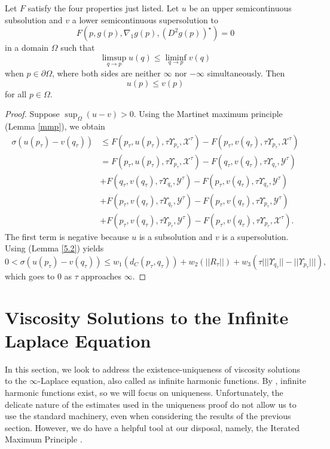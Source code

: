 \documentclass[reqno]{amsart}
\begin{document}
\begin{theorem}
Let $F$ satisfy the four properties just listed. Let $u$ be an upper semicontinuous subsolution and $v$ a lower semicontinuous supersolution to 
\[F(p,g(p),\nabla_1g(p), (D^2g(p))^\star)=0\]
in a domain $\Omega$ such that
\[\limsup_{q\rightarrow p}u(q)\leq\liminf_{q\rightarrow p}v(q)\]
when $p\in\partial\Omega$, where both sides are neither $\infty$ nor $-\infty$ simultaneously. Then
\[u(p)\leq v(p)\]
for all $p\in\Omega$.
\end{theorem}
\begin{proof}
Suppose $\sup_\Omega (u-v)>0.$ Using the Martinet maximum principle (Lemma \ref{mmp}), we obtain
\begin{align*}
\sigma (u(p_\tau)-v(q_\tau))&\leq F(p_\tau,u(p_\tau),\tau\Upsilon_{p_\tau}, \mathcal{X}^\tau)-F(p_\tau,v(q_\tau),\tau\Upsilon_{p_\tau}, \mathcal{X}^\tau)\\
&=F(p_\tau,u(p_\tau),\tau\Upsilon_{p_\tau}, \mathcal{X}^\tau)-F(q_\tau,v(q_\tau),\tau\Upsilon_{q_\tau}, \mathcal{Y}^\tau)\\
&+F(q_\tau,v(q_\tau),\tau\Upsilon_{q_\tau}, \mathcal{Y}^\tau)-F(p_\tau,v(q_\tau),\tau\Upsilon_{q_\tau}, \mathcal{Y}^\tau)\\
&+F(p_\tau,v(q_\tau),\tau\Upsilon_{q_\tau}, \mathcal{Y}^\tau)-F(p_\tau,v(q_\tau),\tau\Upsilon_{p_\tau}, \mathcal{Y}^\tau)\\
&+F(p_\tau,v(q_\tau),\tau\Upsilon_{p_\tau}, \mathcal{Y}^\tau)-F(p_\tau,v(q_\tau),\tau\Upsilon_{p_\tau}, \mathcal{X}^\tau).
\end{align*}
The first term is negative because $u$ is a subsolution and $v$ is a supersolution. Using (Lemma \ref{5.2}) yields
\[0<\sigma (u(p_\tau)-v(q_\tau))\leq w_1(d_C(p_\tau,q_\tau))+w_2(||R_\tau||)+w_3(\tau\big|||\Upsilon_{q_\tau}||-||\Upsilon_{p_\tau}||\big|),\]
which goes to 0 as $\tau$ approaches $\infty $.
\end{proof}
\section{Viscosity Solutions to the Infinite Laplace Equation}
In this section, we look to address the existence-uniqueness of viscosity solutions to the $\infty$-Laplace equation, also called as infinite harmonic functions. By \cite{CGPV}, infinite harmonic functions exist, so we will focus on uniqueness. Unfortunately, the delicate nature of the estimates used in the uniqueness proof do not allow us to use the standard machinery, even when considering the results of the previous section. However, we do have a helpful tool at our disposal, namely, the Iterated Maximum Principle \cite{B:GS}. 
\end{document}
